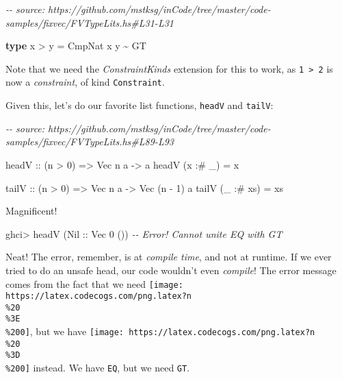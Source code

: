 \documentclass[]{article}
\newenvironment{Shaded}{}{}
\newcommand{\CommentTok}[1]{\textcolor[rgb]{0.38,0.63,0.69}{\textit{#1}}}
\newcommand{\DataTypeTok}[1]{\textcolor[rgb]{0.56,0.13,0.00}{#1}}
\newcommand{\DecValTok}[1]{\textcolor[rgb]{0.25,0.63,0.44}{#1}}
\newcommand{\KeywordTok}[1]{\textcolor[rgb]{0.00,0.44,0.13}{\textbf{#1}}}
\newcommand{\NormalTok}[1]{#1}
\newcommand{\OperatorTok}[1]{\textcolor[rgb]{0.40,0.40,0.40}{#1}}
\newcommand{\OtherTok}[1]{\textcolor[rgb]{0.00,0.44,0.13}{#1}}
\begin{document}
\begin{Shaded}
\begin{Highlighting}[]
\CommentTok{{-}{-} source: https://github.com/mstksg/inCode/tree/master/code{-}samples/fixvec/FVTypeLits.hs\#L31{-}L31}

\KeywordTok{type}\NormalTok{ x }\OperatorTok{>}\NormalTok{ y }\OtherTok{=} \DataTypeTok{CmpNat}\NormalTok{ x y }\OperatorTok{\textasciitilde{}} \DataTypeTok{\textquotesingle{}GT}
\end{Highlighting}
\end{Shaded}

Note that we need the \emph{ConstraintKinds} extension for this to work, as
\texttt{1\ \textgreater{}\ 2} is now a \emph{constraint}, of kind
\texttt{Constraint}.

Given this, let's do our favorite list functions, \texttt{headV} and
\texttt{tailV}:

\begin{Shaded}
\begin{Highlighting}[]
\CommentTok{{-}{-} source: https://github.com/mstksg/inCode/tree/master/code{-}samples/fixvec/FVTypeLits.hs\#L89{-}L93}

\OtherTok{headV ::}\NormalTok{ (n }\OperatorTok{>} \DecValTok{0}\NormalTok{) }\OtherTok{=>} \DataTypeTok{Vec}\NormalTok{ n a }\OtherTok{{-}>}\NormalTok{ a}
\NormalTok{headV (x }\OperatorTok{:\#}\NormalTok{ \_)  }\OtherTok{=}\NormalTok{ x}

\OtherTok{tailV ::}\NormalTok{ (n }\OperatorTok{>} \DecValTok{0}\NormalTok{) }\OtherTok{=>} \DataTypeTok{Vec}\NormalTok{ n a }\OtherTok{{-}>} \DataTypeTok{Vec}\NormalTok{ (n }\OperatorTok{{-}} \DecValTok{1}\NormalTok{) a}
\NormalTok{tailV (\_ }\OperatorTok{:\#}\NormalTok{ xs) }\OtherTok{=}\NormalTok{ xs}
\end{Highlighting}
\end{Shaded}

Magnificent!

\begin{Shaded}
\begin{Highlighting}[]
\NormalTok{ghci}\OperatorTok{>}\NormalTok{ headV (}\DataTypeTok{Nil}\OtherTok{ ::} \DataTypeTok{Vec} \DecValTok{0}\NormalTok{ ())}
\CommentTok{{-}{-} Error!  Cannot unite \textquotesingle{}EQ with \textquotesingle{}GT}
\end{Highlighting}
\end{Shaded}

Neat! The error, remember, is at \emph{compile time}, and not at runtime. If we
ever tried to do an unsafe head, our code wouldn't even \emph{compile}! The
error message comes from the fact that we need
\texttt{[image: https://latex.codecogs.com/png.latex?n\\\%20\\\%3E\\\%200]}, but we
have \texttt{[image: https://latex.codecogs.com/png.latex?n\\\%20\\\%3D\\\%200]}
instead. We have \texttt{EQ}, but we need \texttt{GT}.
\end{document}
